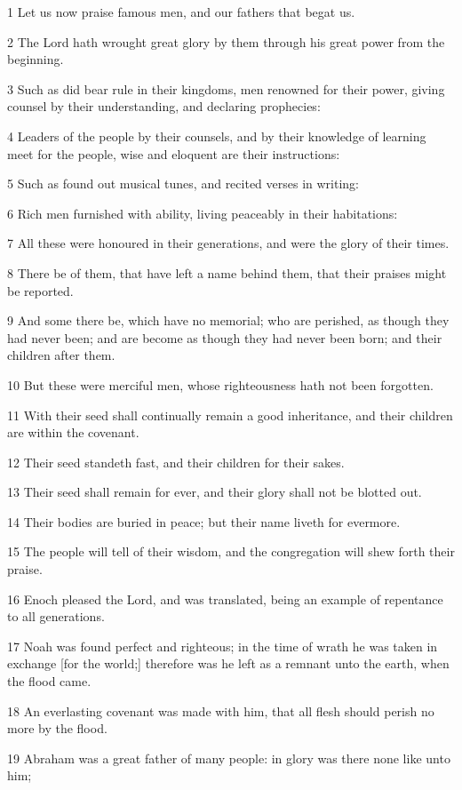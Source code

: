 \par 1 Let us now praise famous men, and our fathers that begat us.
\par 2 The Lord hath wrought great glory by them through his great power from the beginning.
\par 3 Such as did bear rule in their kingdoms, men renowned for their power, giving counsel by their understanding, and declaring prophecies:
\par 4 Leaders of the people by their counsels, and by their knowledge of learning meet for the people, wise and eloquent are their instructions:
\par 5 Such as found out musical tunes, and recited verses in writing:
\par 6 Rich men furnished with ability, living peaceably in their habitations:
\par 7 All these were honoured in their generations, and were the glory of their times.
\par 8 There be of them, that have left a name behind them, that their praises might be reported.
\par 9 And some there be, which have no memorial; who are perished, as though they had never been; and are become as though they had never been born; and their children after them.
\par 10 But these were merciful men, whose righteousness hath not been forgotten.
\par 11 With their seed shall continually remain a good inheritance, and their children are within the covenant.
\par 12 Their seed standeth fast, and their children for their sakes.
\par 13 Their seed shall remain for ever, and their glory shall not be blotted out.
\par 14 Their bodies are buried in peace; but their name liveth for evermore.
\par 15 The people will tell of their wisdom, and the congregation will shew forth their praise.
\par 16 Enoch pleased the Lord, and was translated, being an example of repentance to all generations.
\par 17 Noah was found perfect and righteous; in the time of wrath he was taken in exchange [for the world;] therefore was he left as a remnant unto the earth, when the flood came.
\par 18 An everlasting covenant was made with him, that all flesh should perish no more by the flood.
\par 19 Abraham was a great father of many people: in glory was there none like unto him;
